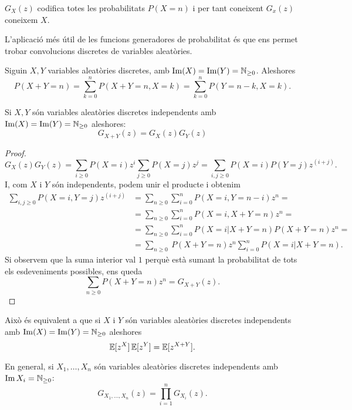 \begin{obs}
    $G_X(z)$ codifica totes les probabilitats $P(X = n)$ i per tant coneixent
    $G_x(z)$ coneixem $X$.
\end{obs}

L'aplicació m\'es útil de les funcions generadores de probabilitat \'es que
ens permet trobar convolucions discretes de variables aleatòries.

\begin{obs}
    Siguin $X, Y$ variables aleatòries discretes, amb $\operatorname{Im}(X) = \operatorname{Im}(Y) =
    \mathbb{N}_{\geq 0}$. Aleshores
    \[
        P(X+Y = n) = \sum_{k = 0}^{n} P(X+Y = n, X = k) = 
        \sum_{k = 0}^{n} P(Y = n-k, X = k). 
    \]
\end{obs}

\begin{prop}
    Si $X, Y$ són variables aleatòries discretes independents amb $\operatorname{Im}(X) = \operatorname{Im}(Y) =
    \mathbb{N}_{\geq 0}$ aleshores:
    \[
        G_{X+Y}(z) = G_X(z)G_Y(z)
    \]
\end{prop}

\begin{proof}
    \[
        G_X(z)G_Y(z) = \sum_{i \geq 0} P(X = i) z^i  \sum_{j \geq 0} P(X = j) z^j =
         \sum_{i, j \geq 0} P(X = i)P(Y = j) z^{(i+j)}.
    \]
    I, com $X$ i $Y$ són independents, podem unir el producte i obtenim
    \begin{align*} 
        \sum_{i, j \geq 0} P(X = i, Y = j) z^{(i+j)} & = \sum_{n \geq 0} \sum_{i = 0}^n
        P(X = i, Y = n-i)z^n =\\
        &= \sum_{n \geq 0} \sum_{i = 0}^n P(X = i, X+Y = n)z^n =\\
        & = \sum_{n \geq 0} \sum_{i = 0}^n P(X = i | X+Y = n) P(X+Y = n)z^n = \\
        & = \sum_{n \geq 0} \ P(X+Y = n)z^n \sum_{i = 0}^n P(X = i | X+Y = n).
    \end{align*}
    Si observem que la suma interior val $1$ perquè està sumant la probabilitat de tots
    els esdeveniments possibles, ens queda
    \[
        \sum_{n \geq 0} P(X+Y = n)z^n = G_{X+Y}(z).
    \]
\end{proof}

\begin{obs}
    Això \'es equivalent a que si $X$ i $Y$ són variables aleatòries discretes independents
    amb $\operatorname{Im}(X) = \operatorname{Im}(Y) = \mathbb{N}_{\geq 0}$ aleshores
    \[
        \operatorname{\mathbb{E}}[z^X]\operatorname{\mathbb{E}}[z^Y] = \operatorname{\mathbb{E}}[z^{X+Y}].
    \]
\end{obs}

\begin{obs}
    En general, si $X_1, \dots, X_n$ són variables aleatòries discretes independents amb
    $\operatorname{Im} X_i = \mathbb{N}_{\geq 0}$:
    \[
        G_{X_1,\dots,X_n}(z) = \prod_{i = 1}^n G_{X_i}(z).
    \]
\end{obs}

